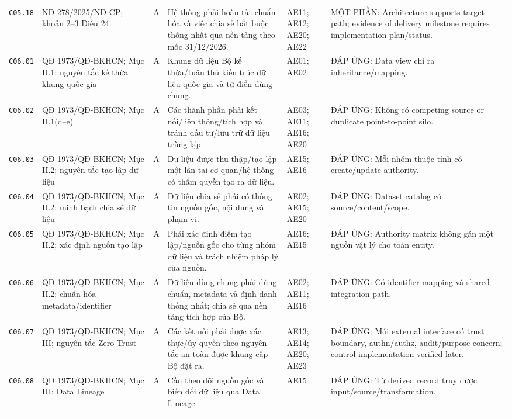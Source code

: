 \begin{longtable}{@{}p{0.9cm}p{3.0cm}p{0.55cm}p{4.05cm}p{2.0cm}p{3.45cm}@{}}
\texttt{C05.18} & NĐ 278/2025/NĐ-CP; khoản 2--3 Điều 24 & A & Hệ thống phải hoàn tất chuẩn hóa và việc chia sẻ bắt buộc thống nhất qua nền tảng theo mốc 31/12/2026. & AE11; AE12; AE20; AE22 & MỘT PHẦN: Architecture supports target path; evidence of delivery milestone requires implementation plan/status. \\ \addlinespace[1pt]
\texttt{C06.01} & QĐ 1973/QĐ-BKHCN; Mục II.1; nguyên tắc kế thừa khung quốc gia & A & Khung dữ liệu Bộ kế thừa/tuân thủ kiến trúc dữ liệu quốc gia và từ điển dùng chung. & AE01; AE02 & ĐÁP ỨNG: Data view chỉ ra inheritance/mapping. \\ \addlinespace[1pt]
\texttt{C06.02} & QĐ 1973/QĐ-BKHCN; Mục II.1(d--e) & A & Các thành phần phải kết nối/liên thông/tích hợp và tránh đầu tư/lưu trữ dữ liệu trùng lặp. & AE03; AE11; AE16; AE20 & ĐÁP ỨNG: Không có competing source or duplicate point-to-point silo. \\ \addlinespace[1pt]
\texttt{C06.03} & QĐ 1973/QĐ-BKHCN; Mục II.2; nguyên tắc tạo lập dữ liệu & A & Dữ liệu được thu thập/tạo lập một lần tại cơ quan/hệ thống có thẩm quyền tạo ra dữ liệu. & AE15; AE16 & ĐÁP ỨNG: Mỗi nhóm thuộc tính có create/update authority. \\ \addlinespace[1pt]
\texttt{C06.04} & QĐ 1973/QĐ-BKHCN; Mục II.2; minh bạch chia sẻ dữ liệu & A & Dữ liệu chia sẻ phải có thông tin nguồn gốc, nội dung và phạm vi. & AE02; AE15; AE20 & ĐÁP ỨNG: Dataset catalog có source/content/scope. \\ \addlinespace[1pt]
\texttt{C06.05} & QĐ 1973/QĐ-BKHCN; Mục II.2; xác định nguồn tạo lập & A & Phải xác định điểm tạo lập/nguồn gốc cho từng nhóm dữ liệu và trách nhiệm pháp lý của nguồn. & AE16; AE15 & ĐÁP ỨNG: Authority matrix không gán một nguồn vật lý cho toàn entity. \\ \addlinespace[1pt]
\texttt{C06.06} & QĐ 1973/QĐ-BKHCN; Mục II.2; chuẩn hóa metadata/identifier & A & Dữ liệu dùng chung phải dùng chuẩn, metadata và định danh thống nhất; chia sẻ qua nền tảng tích hợp của Bộ. & AE02; AE11; AE16 & ĐÁP ỨNG: Có identifier mapping và shared integration path. \\ \addlinespace[1pt]
\texttt{C06.07} & QĐ 1973/QĐ-BKHCN; Mục III; nguyên tắc Zero Trust & A & Các kết nối phải được xác thực/ủy quyền theo nguyên tắc an toàn được khung cấp Bộ đặt ra. & AE13; AE14; AE20; AE23 & ĐÁP ỨNG: Mỗi external interface có trust boundary, authn/authz, audit/purpose concern; control implementation verified later. \\ \addlinespace[1pt]
\texttt{C06.08} & QĐ 1973/QĐ-BKHCN; Mục III; Data Lineage & A & Cần theo dõi nguồn gốc và biến đổi dữ liệu qua Data Lineage. & AE15 & ĐÁP ỨNG: Từ derived record truy được input/source/transformation. \\ \addlinespace[1pt]

\end{longtable}
